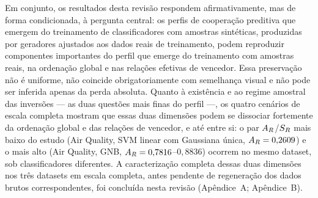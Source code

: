 Em conjunto, os resultados desta revisão respondem afirmativamente, mas de forma condicionada, à pergunta central: os perfis de cooperação preditiva que emergem do treinamento de classificadores com amostras sintéticas, produzidas por geradores ajustados aos dados reais de treinamento, podem reproduzir componentes importantes do perfil que emerge do treinamento com amostras reais, na ordenação global e nas relações efetivas de vencedor. Essa preservação não é uniforme, não coincide obrigatoriamente com semelhança visual e não pode ser inferida apenas da perda absoluta. Quanto à existência e ao regime amostral das inversões --- as duas questões mais finas do perfil ---, os quatro cenários de escala completa mostram que essas duas dimensões podem se dissociar fortemente da ordenação global e das relações de vencedor, e até entre si: o par $A_R$/$S_R$ mais baixo do estudo (Air Quality, SVM linear com Gaussiana única, $A_R=0{,}2609$) e o mais alto (Air Quality, GNB, $A_R=0{,}7816$--$0{,}8836$) ocorrem no mesmo dataset, sob classificadores diferentes. A caracterização completa dessas duas dimensões nos três datasets em escala completa, antes pendente de regeneração dos dados brutos correspondentes, foi concluída nesta revisão (Apêndice~A; Apêndice~B).

